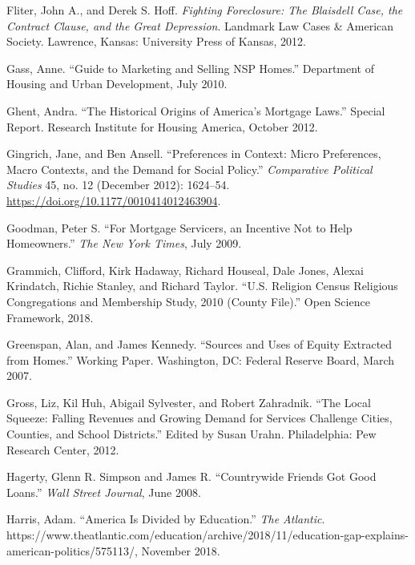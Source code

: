 \documentclass[12pt,oneside]{psthesis}
\begin{document}
\leavevmode\hypertarget{ref-fliter2012fighting}{}%
Fliter, John A., and Derek S. Hoff. \emph{Fighting Foreclosure: The Blaisdell Case, the Contract Clause, and the Great Depression}. Landmark Law Cases \& American Society. Lawrence, Kansas: University Press of Kansas, 2012.

\leavevmode\hypertarget{ref-gass2010guide}{}%
Gass, Anne. ``Guide to Marketing and Selling NSP Homes.'' Department of Housing and Urban Development, July 2010.

\leavevmode\hypertarget{ref-ghent2012historical}{}%
Ghent, Andra. ``The Historical Origins of America's Mortgage Laws.'' Special Report. Research Institute for Housing America, October 2012.

\leavevmode\hypertarget{ref-gingrich2012preferences}{}%
Gingrich, Jane, and Ben Ansell. ``Preferences in Context: Micro Preferences, Macro Contexts, and the Demand for Social Policy.'' \emph{Comparative Political Studies} 45, no. 12 (December 2012): 1624--54. \url{https://doi.org/10.1177/0010414012463904}.

\leavevmode\hypertarget{ref-goodman2009mortgage}{}%
Goodman, Peter S. ``For Mortgage Servicers, an Incentive Not to Help Homeowners.'' \emph{The New York Times}, July 2009.

\leavevmode\hypertarget{ref-grammich2018religion}{}%
Grammich, Clifford, Kirk Hadaway, Richard Houseal, Dale Jones, Alexai Krindatch, Richie Stanley, and Richard Taylor. ``U.S. Religion Census Religious Congregations and Membership Study, 2010 (County File).'' Open Science Framework, 2018.

\leavevmode\hypertarget{ref-greenspan2007sources}{}%
Greenspan, Alan, and James Kennedy. ``Sources and Uses of Equity Extracted from Homes.'' Working Paper. Washington, DC: Federal Reserve Board, March 2007.

\leavevmode\hypertarget{ref-gross2012local}{}%
Gross, Liz, Kil Huh, Abigail Sylvester, and Robert Zahradnik. ``The Local Squeeze: Falling Revenues and Growing Demand for Services Challenge Cities, Counties, and School Districts.'' Edited by Susan Urahn. Philadelphia: Pew Research Center, 2012.

\leavevmode\hypertarget{ref-hagerty2008countrywide}{}%
Hagerty, Glenn R. Simpson and James R. ``Countrywide Friends Got Good Loans.'' \emph{Wall Street Journal}, June 2008.

\leavevmode\hypertarget{ref-harris2018america}{}%
Harris, Adam. ``America Is Divided by Education.'' \emph{The Atlantic}. https://www.theatlantic.com/education/archive/2018/11/education-gap-explains-american-politics/575113/, November 2018.
\end{document}
